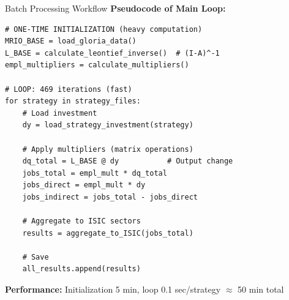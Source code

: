 \documentclass[10pt]{beamer}
\begin{document}
\begin{frame}[fragile]{Batch Processing Workflow}
\textbf{Pseudocode of Main Loop:}

\vspace{0.2cm}

\begin{verbatim}
# ONE-TIME INITIALIZATION (heavy computation)
MRIO_BASE = load_gloria_data()
L_BASE = calculate_leontief_inverse()  # (I-A)^-1
empl_multipliers = calculate_multipliers()

# LOOP: 469 iterations (fast)
for strategy in strategy_files:
    # Load investment
    dy = load_strategy_investment(strategy)

    # Apply multipliers (matrix operations)
    dq_total = L_BASE @ dy           # Output change
    jobs_total = empl_mult * dq_total
    jobs_direct = empl_mult * dy
    jobs_indirect = jobs_total - jobs_direct

    # Aggregate to ISIC sectors
    results = aggregate_to_ISIC(jobs_total)

    # Save
    all_results.append(results)
\end{verbatim}

\vspace{0.3cm}

\textbf{Performance:} Initialization 5 min, loop 0.1 sec/strategy $\approx$ 50 min total

\end{frame}
\end{document}
